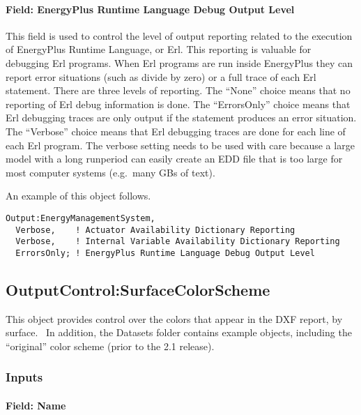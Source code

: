 \paragraph{Field: EnergyPlus Runtime Language Debug Output Level}\label{field-energyplus-runtime-language-debug-output-level}

This field is used to control the level of output reporting related to the execution of EnergyPlus Runtime Language, or Erl. This reporting is valuable for debugging Erl programs. When Erl programs are run inside EnergyPlus they can report error situations (such as divide by zero) or a full trace of each Erl statement. There are three levels of reporting. The ``None'' choice means that no reporting of Erl debug information is done. The ``ErrorsOnly'' choice means that Erl debugging traces are only output if the statement produces an error situation. The ``Verbose'' choice means that Erl debugging traces are done for each line of each Erl program. The verbose setting needs to be used with care because a large model with a long runperiod can easily create an EDD file that is too large for most computer systems (e.g.~many GBs of text).

An example of this object follows.

\begin{lstlisting}
Output:EnergyManagementSystem,
  Verbose,    ! Actuator Availability Dictionary Reporting
  Verbose,    ! Internal Variable Availability Dictionary Reporting
  ErrorsOnly; ! EnergyPlus Runtime Language Debug Output Level
\end{lstlisting}

\subsection{OutputControl:SurfaceColorScheme}\label{outputcontrolsurfacecolorscheme}

This object provides control over the colors that appear in the DXF report, by surface.~ In addition, the Datasets folder contains example objects, including the ``original'' color scheme (prior to the 2.1 release).

\subsubsection{Inputs}\label{inputs-6-021}

\paragraph{Field: Name}\label{field-name-039}

